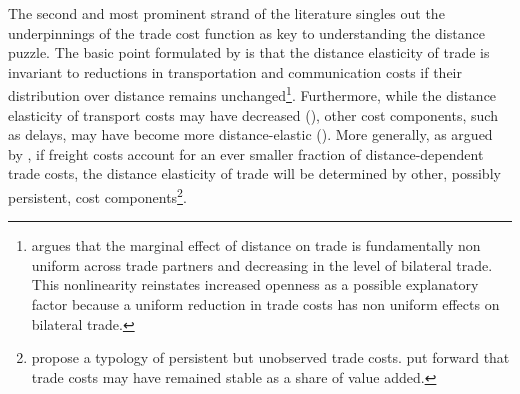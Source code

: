 \documentclass[12pt,twoside,a4paper,notitlepage]{article}
\begin{document}
%

The second and most prominent strand of the literature singles out the underpinnings of the trade cost function as key to understanding the distance puzzle.
The basic point formulated by \cite{Buch2004} is that the distance elasticity of trade is invariant to reductions in transportation and communication costs if their distribution over distance remains unchanged\footnote{\cite{Egger2008} argues that the marginal effect of distance on trade is fundamentally non uniform across trade partners and decreasing in the level of bilateral trade.
This nonlinearity reinstates increased openness as a possible explanatory factor because a uniform reduction in trade costs has non uniform effects on bilateral trade.}.
Furthermore, while the distance elasticity of transport costs may have decreased (\cite{Hummels2007}), other cost components, such as delays, may have become more distance-elastic (\cite{Hummels2013}).
More generally, as argued by \cite{Head2013}, if freight costs account for an ever smaller fraction of distance-dependent trade costs, the distance elasticity of trade will be determined by other, possibly persistent, cost components\footnote{\cite{Head2013} propose a typology of persistent but unobserved trade costs.
\cite{Daudin2003, Daudin2005} put forward that trade costs may have remained stable as a share of value added.}.
%
\end{document}
